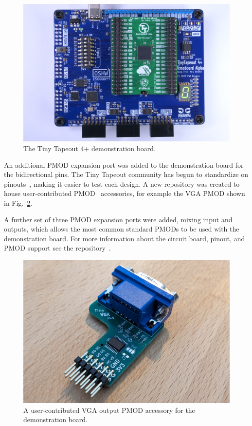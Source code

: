 \begin{figure}[!t]
\centering
\includegraphics[width=\columnwidth]{./Figs/tt04-demoboard-top.jpg}
\caption{The Tiny Tapeout 4+ demonstration board\cite{tt04demoboard}.}
\label{fig:TT04plus_demo_board}
\end{figure}

An additional PMOD expansion port was added to the demonstration board for the bidirectional pins. The Tiny Tapeout community has begun to standardize on pinouts~\cite{pinouts}, making it easier to test each design.
A new repository was created to house user-contributed PMOD~\cite{awesomepmods} accessories, for example the VGA PMOD shown in Fig.~\ref{fig:user_contributed_VGA_PMOD}.

A further set of three PMOD expansion ports were added, mixing input and outputs, which allows the most common standard PMODs to be used with the demonstration board. For more information about the circuit board, pinout, and PMOD support see the repository~\cite{tt04demoboard}.

\begin{figure}[!t]
\centering
\includegraphics[width=\columnwidth]{./Figs/tiny_vga_pmod.jpg}
\caption{A user-contributed VGA output PMOD accessory for the demonstration board.}
\label{fig:user_contributed_VGA_PMOD}
\end{figure}
